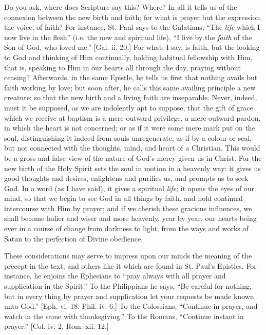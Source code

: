 Do you ask, where does Scripture say this? Where? In all it tells
us of the connexion between the new birth and faith; for what is
prayer but the expression, the voice, of faith? For instance, St. Paul
says to the Galatians, ``The \emph{life} which I now live in the
flesh'' (i.e. the new and spiritual life), ``I live by the \emph{faith}
of the Son of God, who loved me.'' [Gal. ii. 20.] For what, I say,
is faith, but the looking to God and thinking of Him continually,
holding habitual fellowship with Him, that is, speaking to Him in our
hearts all through the day, praying without ceasing? Afterwards, in
the same Epistle, he tells us first that nothing avails but faith
working by love; but soon after, he calls this same availing principle
a new creature: so that the new birth and a living faith are
inseparable. Never, indeed, must it be supposed, as we are indolently
apt to suppose, that the gift of grace which we receive at baptism is
a mere outward privilege, a mere outward pardon, in which the heart is
not concerned; or as if it were some mere mark put on the soul,
distinguishing it indeed from souls unregenerate, as if by a colour or
seal, but not connected with the thoughts, mind, and heart of a
Christian. This would be a gross and false view of the nature of God's
mercy given us in Christ. For the new birth of the Holy Spirit sets
the soul in motion in a heavenly way: it gives us good thoughts and
desires, enlightens and purifies us, and prompts us to seek God. In a
word (as I have said), it gives a spiritual \emph{life}; it opens the
eyes of our mind, so that we begin to see God in all things by faith,
and hold continual intercourse with Him by prayer; and if we cherish
these gracious influences, we shall become holier and wiser and more
heavenly, year by year, our hearts being ever in a course of change
from darkness to light, from the ways and works of Satan to the
perfection of Divine obedience.

These considerations may serve to impress upon our minds the
meaning of the precept in the text, and others like it which are found
in St. Paul's Epistles. For instance, he enjoins the Ephesians to
``pray always with all prayer and supplication in the
Spirit.'' To the Philippians he says, ``Be careful for
nothing; but in every thing by prayer and supplication let your
requests be made known unto God.'' [Eph. vi. 18. Phil. iv. 6.] To
the Colossians, ``Continue in prayer, and watch in the same with
thanksgiving.'' To the Romans, ``Continue instant in
prayer.'' [Col. iv. 2. Rom. xii. 12.]

